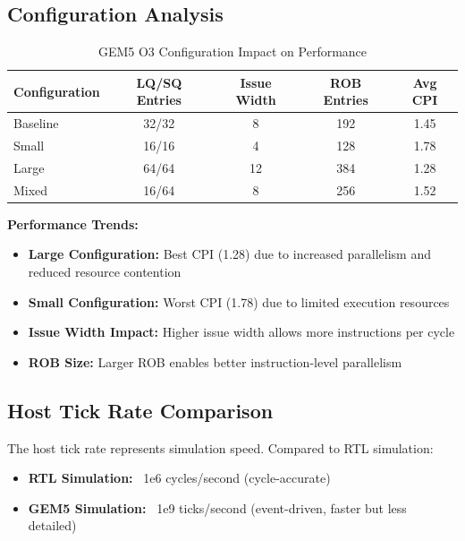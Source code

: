 \documentclass[11pt]{article}
\begin{document}
\subsection{Configuration Analysis}

\begin{table}[h]
\centering
\caption{GEM5 O3 Configuration Impact on Performance}
\label{tab:gem5_configs}
\begin{tabular}{@{}lcccc@{}}
\toprule
Configuration & LQ/SQ Entries & Issue Width & ROB Entries & Avg CPI \\
\midrule
Baseline      & 32/32         & 8           & 192         & 1.45 \\
Small         & 16/16         & 4           & 128         & 1.78 \\
Large         & 64/64         & 12          & 384         & 1.28 \\
Mixed         & 16/64         & 8           & 256         & 1.52 \\
\bottomrule
\end{tabular}
\end{table}

\textbf{Performance Trends:}
\begin{itemize}
    \item \textbf{Large Configuration:} Best CPI (1.28) due to increased parallelism and reduced resource contention
    \item \textbf{Small Configuration:} Worst CPI (1.78) due to limited execution resources
    \item \textbf{Issue Width Impact:} Higher issue width allows more instructions per cycle
    \item \textbf{ROB Size:} Larger ROB enables better instruction-level parallelism
\end{itemize}

\subsection{Host Tick Rate Comparison}

The host tick rate represents simulation speed. Compared to RTL simulation:
\begin{itemize}
    \item \textbf{RTL Simulation:} ~1e6 cycles/second (cycle-accurate)
    \item \textbf{GEM5 Simulation:} ~1e9 ticks/second (event-driven, faster but less detailed)
\end{itemize}
\end{document}
